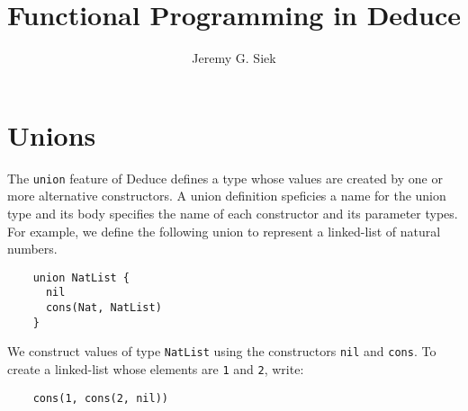 \documentclass[12pt]{article}
\title{Functional Programming in Deduce}
\author{Jeremy G. Siek}
\begin{document}
\maketitle



\tableofcontents



\pagebreak

\large

\section{Unions}
\label{sec:union}

The \texttt{union} feature of Deduce defines a type whose values are
created by one or more alternative constructors.  A union definition
speficies a name for the union type and its body specifies the name of
each constructor and its parameter types. For example, we define the
following union to represent a linked-list of natural numbers.

\begin{verbatim}
    union NatList {
      nil
      cons(Nat, NatList)
    }
\end{verbatim}

We construct values of type \texttt{NatList} using the constructors
\texttt{nil} and \texttt{cons}. To create a linked-list whose elements
are \texttt{1} and \texttt{2}, write:

\begin{verbatim}
    cons(1, cons(2, nil))
\end{verbatim}
\end{document}
